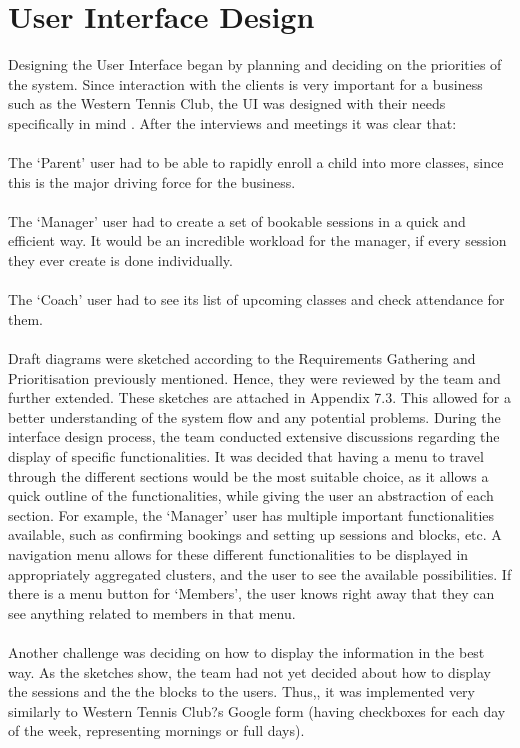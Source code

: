 \documentclass{l3proj}
\begin{document}
\section{User Interface Design}
\par
Designing the User Interface began by planning and deciding on the priorities of the system. Since interaction with the clients is very important for a business such as the Western Tennis Club, the UI was designed with their needs specifically in mind \cite{UID}. After the interviews and meetings it was clear that:\\
\\The `Parent' user had to be able to rapidly enroll a child into more classes, since this is the major driving force for the business.\\
\\The `Manager' user had to create a set of bookable sessions in a quick and efficient way. It would be an incredible workload for the manager, if every session they ever create is done individually.\\
\\The `Coach' user had to see its list of upcoming classes and check attendance for them.\\
\\Draft diagrams were sketched according to the Requirements Gathering and Prioritisation previously mentioned. Hence, they were reviewed by the team and further extended. These sketches are attached in Appendix 7.3. This allowed for a better understanding of the system flow and any potential problems. During the interface design process, the team conducted extensive discussions regarding the display of specific functionalities.  It was decided that having a menu to travel through the different sections would be the most suitable choice, as it allows a quick outline of the functionalities, while giving the user an abstraction of each section. For example, the `Manager' user has multiple important functionalities available, such as confirming bookings and setting up sessions and blocks, etc. A navigation menu allows for these different functionalities to be displayed in appropriately aggregated clusters, and the user to see the available possibilities. If there is a menu button for `Members', the user knows right away that they can see anything related to members in that menu.\\
\\Another challenge was deciding on how to display the information in the best way. As the sketches show, the team had not yet decided about how to display the sessions and the the blocks to the users. Thus,, it was implemented very similarly to Western Tennis Club?s Google form (having checkboxes for each day of the week, representing mornings or full days). \\
\end{document}
